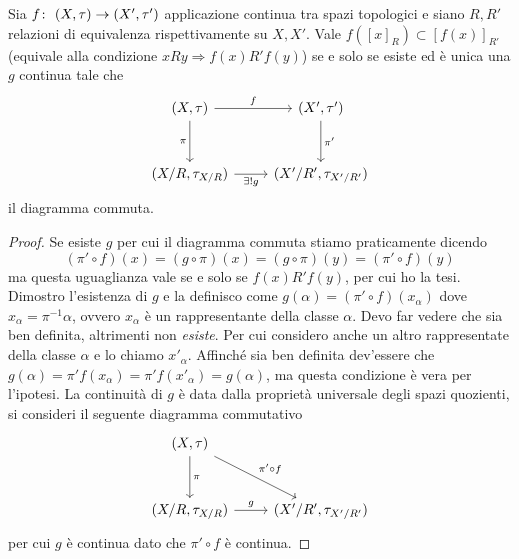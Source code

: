 \begin{lemma}
	\label{lem_qdom}
	Sia $f \colon\ (X, \tau) \rightarrow (X', \tau')$ applicazione continua tra spazi topologici e siano $R, R'$ relazioni di equivalenza rispettivamente su $X, X'$. Vale $f(\left[x\right]_R) \subset \left[f(x)\right]_{R'}$ (equivale alla condizione $xRy \Rightarrow f(x)R'f(y)$) se e solo se esiste ed è unica una $g$ continua tale che 
	\begin{equation*}
	\begin{tikzcd}[row sep = 3em]
		(X, \tau) \arrow[swap]{d}{\pi} \arrow{r}{f} & (X', \tau') \arrow{d}{\pi'}\\
		(X/R, \tau_{X/R}) \arrow[swap]{r}{\exists! g} & (X'/R', \tau_{X'/R'})
	\end{tikzcd}
	\end{equation*} 	
	il diagramma commuta.
\end{lemma}
\begin{proof}
	Se esiste $g$ per cui il diagramma commuta stiamo praticamente dicendo 
	\begin{equation*}
		(\pi' \circ f)(x) = (g \circ \pi)(x) = (g \circ \pi)(y) = (\pi' \circ f)(y)
	\end{equation*}
	ma questa uguaglianza vale se e solo se $f(x) R' f(y)$, per cui ho la tesi.\\
	
	Dimostro l'esistenza di $g$ e la definisco come $g(\alpha) = (\pi' \circ f)(x_\alpha)$ dove $x_\alpha = \pi^{-1}\alpha$, ovvero $x_\alpha$ è un rappresentante della classe $\alpha$. Devo far vedere che sia ben definita, altrimenti non \textit{esiste}.
	Per cui considero anche un altro rappresentate della classe $\alpha$ e lo chiamo $x'_\alpha$. Affinché sia ben definita dev'essere che $g(\alpha) = \pi'f(x_\alpha) = \pi' f(x'_\alpha) = g(\alpha)$, ma questa condizione è vera per l'ipotesi. La continuità di $g$ è data dalla proprietà universale degli spazi quozienti, si consideri il seguente diagramma commutativo
	\begin{equation*}
		\begin{tikzcd}[row sep = 3em]
			(X,\tau) \arrow{d}{\pi} \arrow{rd}{\pi' \circ f} & \\
			(X/R, \tau_{X/R}) \arrow{r}{g} & (X'/R', \tau_{X'/R'})
		\end{tikzcd}
	\end{equation*}
	per cui $g$ è continua dato che $\pi' \circ f$ è continua.
\end{proof}

